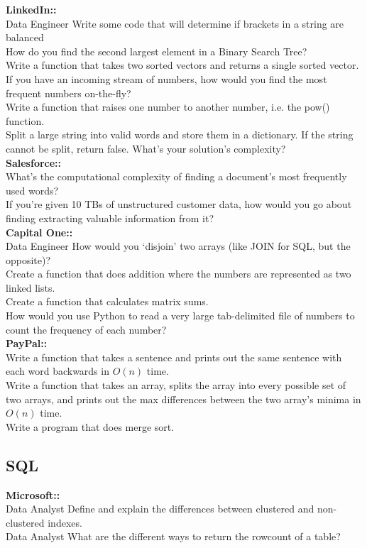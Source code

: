 \documentclass[11pt]{article}
\begin{document}
{\bf LinkedIn:: }\\
Data Engineer Write some code that will determine if brackets in a string are balanced\\
How do you find the second largest element in a Binary Search Tree? \\
Write a function that takes two sorted vectors and returns a single sorted vector. \\
If you have an incoming stream of numbers, how would you find the most frequent numbers on-the-fly? \\
Write a function that raises one number to another number, i.e. the pow() function. \\
Split a large string into valid words and store them in a dictionary. If the string cannot be split, return false. What’s your solution’s complexity? \\

{\bf Salesforce:: }\\
What’s the computational complexity of finding a document’s most frequently used words? \\
If you’re given 10 TBs of unstructured customer data, how would you go about finding extracting valuable information from it?\\

{\bf Capital One:: }\\
Data Engineer How would you ‘disjoin’ two arrays (like JOIN for SQL, but the opposite)? \\
Create a function that does addition where the numbers are represented as two linked lists. \\
Create a function that calculates matrix sums. \\
How would you use Python to read a very large tab-delimited file of numbers to count the frequency of each number? \\

{\bf PayPal:: }\\
Write a function that takes a sentence and prints out the same sentence with each word backwards in $O(n)$ time.\\
Write a function that takes an array, splits the array into every possible set of two arrays, and prints out the max differences between the two array’s minima in $O(n)$ time.\\
Write a program that does merge sort.\\


\subsection{SQL} 
{\bf Microsoft:: }\\
Data Analyst Define and explain the differences between clustered and non-clustered indexes. \\
Data Analyst What are the different ways to return the rowcount of a table?\\
\end{document}
